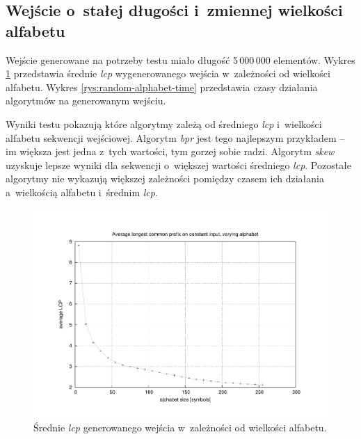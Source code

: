 \subsection{Wejście o~stałej długości i~zmiennej wielkości alfabetu}

Wejście generowane na potrzeby testu miało długość 5\,000\,000 elementów. Wykres
\ref{rys:random-alphabet-lcp} przedstawia średnie \emph{lcp} wygenerowanego wejścia w~zależności od
wielkości alfabetu. Wykres \ref{rys:random-alphabet-time} przedstawia czasy działania algorytmów na
generowanym wejściu.

Wyniki testu pokazują które algorytmy zależą od średniego \emph{lcp} i~wielkości alfabetu sekwencji
wejściowej. Algorytm \emph{bpr} jest tego najlepszym przykładem -- im większa jest jedna z~tych
wartości, tym gorzej sobie radzi. Algorytm \emph{skew} uzyskuje lepsze wyniki dla sekwencji
o~większej wartości średniego \emph{lcp}. Pozostałe algorytmy nie wykazują większej zależności
pomiędzy czasem ich działania a~wielkością alfabetu i~średnim \emph{lcp}.
		
\begin{figure}[p]
       \begin{center}
            \includegraphics[width=\linewidth]{figures/results/random-alphabet-lcp.pdf}
        \end{center}        
    \caption{Średnie \emph{lcp} generowanego wejścia w~zależności od wielkości alfabetu.}%
    \label{rys:random-alphabet-lcp}
\end{figure}

